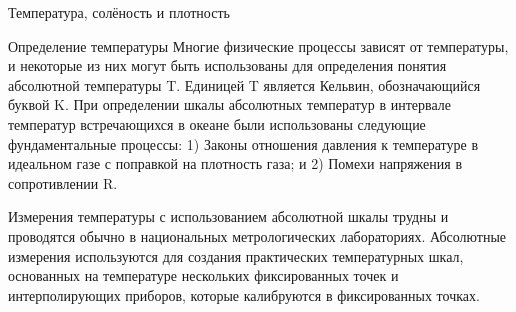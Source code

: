 \begin{chapter}{Температура, солёность и плотность}
\begin{section}{Определение температуры}
Многие физические процессы зависят от температуры, и некоторые из них
могут быть использованы для определения понятия абсолютной температуры
T. Единицей T является Кельвин, обозначающийся буквой K. При
определении шкалы абсолютных температур в интервале температур
встречающихся в океане были использованы следующие фундаментальные
процессы: 1) Законы отношения давления к температуре в идеальном газе
с поправкой на плотность газа; и 2) Помехи напряжения в сопротивлении
R.
%


Измерения температуры с использованием абсолютной шкалы трудны и
проводятся обычно в национальных метрологических
лабораториях. Абсолютные измерения используются для создания
практических температурных шкал, основанных на температуре нескольких
фиксированных точек и интерполирующих приборов, которые калибруются в
фиксированных точках.
%



\end{section}
\end{chapter}
